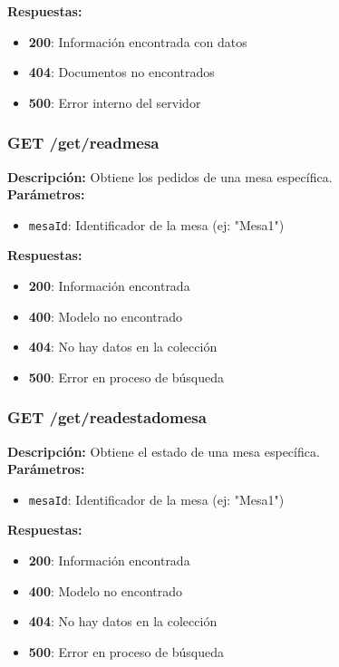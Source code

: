 \documentclass[12pt]{article}
\begin{document}
\textbf{Respuestas:}
\begin{itemize}
    \item \textbf{200}: Información encontrada con datos
    \item \textbf{404}: Documentos no encontrados
    \item \textbf{500}: Error interno del servidor
\end{itemize}

\subsubsection{GET /get/readmesa}
\textbf{Descripción:} Obtiene los pedidos de una mesa específica.\\

\textbf{Parámetros:}
\begin{itemize}
    \item \texttt{mesaId}: Identificador de la mesa (ej: "Mesa1")
\end{itemize}

\textbf{Respuestas:}
\begin{itemize}
    \item \textbf{200}: Información encontrada
    \item \textbf{400}: Modelo no encontrado
    \item \textbf{404}: No hay datos en la colección
    \item \textbf{500}: Error en proceso de búsqueda
\end{itemize}

\subsubsection{GET /get/readestadomesa}
\textbf{Descripción:} Obtiene el estado de una mesa específica.\\

\textbf{Parámetros:}
\begin{itemize}
    \item \texttt{mesaId}: Identificador de la mesa (ej: "Mesa1")
\end{itemize}

\textbf{Respuestas:}
\begin{itemize}
    \item \textbf{200}: Información encontrada
    \item \textbf{400}: Modelo no encontrado
    \item \textbf{404}: No hay datos en la colección
    \item \textbf{500}: Error en proceso de búsqueda
\end{itemize}
\end{document}
